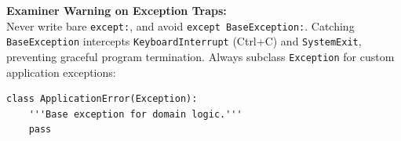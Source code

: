 \begin{memorytip}
\textbf{Examiner Warning on Exception Traps:}\\
Never write bare \texttt{except:}, and avoid \texttt{except BaseException:}. Catching \texttt{BaseException} intercepts \texttt{KeyboardInterrupt} (Ctrl+C) and \texttt{SystemExit}, preventing graceful program termination. Always subclass \texttt{Exception} for custom application exceptions:
\begin{lstlisting}
class ApplicationError(Exception):
    '''Base exception for domain logic.'''
    pass
\end{lstlisting}
\end{memorytip}
